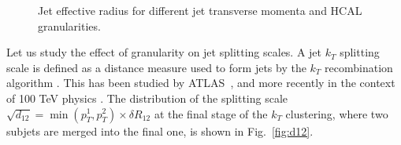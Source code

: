 \begin{figure}
\begin{center}
{   }
\end{center}
\caption{Jet effective radius for different jet transverse momenta and HCAL granularities.}
\label{fig:eff_rad}
\end{figure}


Let us study the effect of granularity on jet splitting scales.
A jet $k_T$ splitting scale \cite{Butterworth:2002tt} is defined as a distance measure
used to form jets by the $k_T$ recombination
algorithm \cite{Catani1993187,Ellis:1993tq}.
This has been studied by ATLAS~\cite{ATLAS:2012am}, and more recently in the context of 100 TeV physics \cite{Auerbach:2014xua}.
The distribution of the splitting scale $\sqrt{d_{12}}=\min(p_T^1,p_T^2) \times \delta R_{12}$ \cite{ATLAS:2012am} at the final stage of the $k_T$ clustering, where two subjets are merged into the final one,
is shown in Fig.~\ref{fig:d12}.

